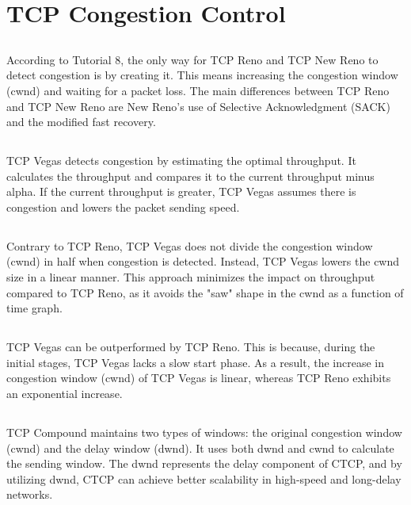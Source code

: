 \documentclass{article}
\begin{document}
\section{TCP Congestion Control}
\subsection{}
According to Tutorial 8, the only way for TCP Reno and TCP New Reno to detect congestion is by creating it.
This means increasing the congestion window (cwnd) and waiting for a packet loss.
The main differences between TCP Reno and TCP New Reno are
New Reno's use of Selective Acknowledgment (SACK) and the modified fast recovery.

\subsection{}
TCP Vegas detects congestion by estimating the optimal throughput.
It calculates the throughput and compares it to the current throughput minus alpha.
If the current throughput is greater, TCP Vegas assumes there
is congestion and lowers the packet sending speed.

\subsection{}
Contrary to TCP Reno, TCP Vegas does not divide the congestion window (cwnd) in half when congestion is detected.
Instead, TCP Vegas lowers the cwnd size in a linear manner. This approach minimizes the impact on throughput compared to TCP Reno,
as it avoids the "saw" shape in the cwnd as a function of time graph.

\subsection{}
TCP Vegas can be outperformed by TCP Reno. This is because, during the initial stages,
TCP Vegas lacks a slow start phase. As a result, the increase in congestion window (cwnd) of TCP Vegas is linear,
whereas TCP Reno exhibits an exponential increase.

\subsection{}
TCP Compound maintains two types of windows: the original congestion window (cwnd) and the delay window (dwnd).
It uses both dwnd and cwnd to calculate the sending window. The dwnd represents the delay component of CTCP,
and by utilizing dwnd, CTCP can achieve better scalability in high-speed and long-delay networks.
\end{document}
